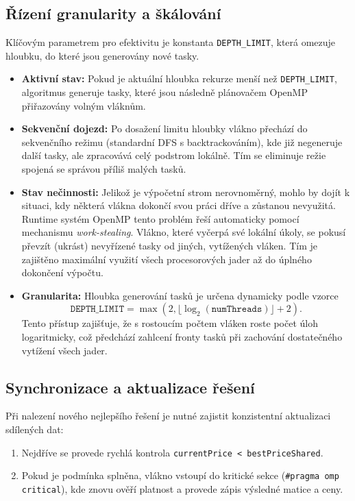 \documentclass[11pt,a4paper]{article}
\begin{document}
\subsection{Řízení granularity a škálování}
Klíčovým parametrem pro efektivitu je konstanta \texttt{DEPTH\_LIMIT}, která omezuje hloubku, do které jsou generovány nové tasky.
\begin{itemize}
    \item \textbf{Aktivní stav:} Pokud je aktuální hloubka rekurze menší než \texttt{DEPTH\_LIMIT}, algoritmus generuje tasky, které jsou následně plánovačem OpenMP přiřazovány volným vláknům.
    \item \textbf{Sekvenční dojezd:} Po dosažení limitu hloubky vlákno přechází do sekvenčního režimu (standardní DFS s backtrackováním), kde již negeneruje další tasky, ale zpracovává celý podstrom lokálně. Tím se eliminuje režie spojená se správou příliš malých tasků.
    \item \textbf{Stav nečinnosti:} Jelikož je výpočetní strom nerovnoměrný, mohlo by dojít k situaci, kdy některá vlákna dokončí svou práci dříve a zůstanou nevyužitá. Runtime systém OpenMP tento problém řeší automaticky pomocí mechanismu \textit{work-stealing}. Vlákno, které vyčerpá své lokální úkoly, se pokusí převzít (ukrást) nevyřízené tasky od jiných, vytížených vláken. Tím je zajištěno maximální využití všech procesorových jader až do úplného dokončení výpočtu.
    \item \textbf{Granularita:} Hloubka generování tasků je určena dynamicky podle vzorce $$\texttt{DEPTH\_LIMIT} = \max(2, \lfloor \log_2(\texttt{numThreads}) \rfloor + 2).$$
     Tento přístup zajišťuje, že s rostoucím počtem vláken roste počet úloh logaritmicky, což předchází zahlcení fronty tasků při zachování dostatečného vytížení všech jader.
\end{itemize}

\subsection{Synchronizace a aktualizace řešení}
Při nalezení nového nejlepšího řešení je nutné zajistit konzistentní aktualizaci sdílených dat:
\begin{enumerate}
    \item Nejdříve se provede rychlá kontrola \texttt{currentPrice < bestPriceShared}.
    \item Pokud je podmínka splněna, vlákno vstoupí do kritické sekce (\texttt{\#pragma omp critical}), kde znovu ověří platnost a provede zápis výsledné matice a ceny.
\end{enumerate}
\end{document}
